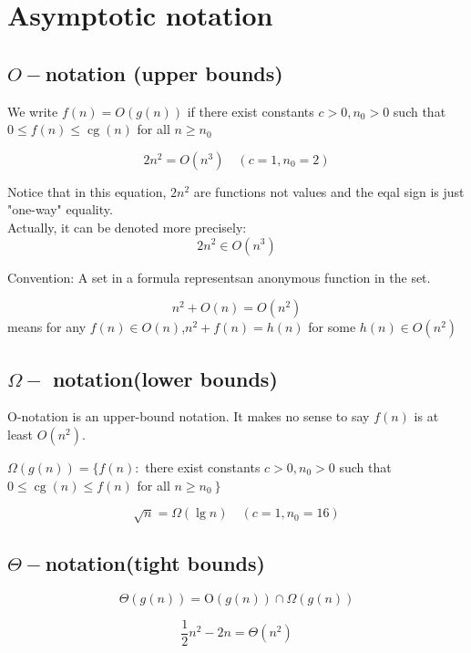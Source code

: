 \documentclass[11pt]{elegantbook}
\begin{document}
\section{Asymptotic notation}
\subsection{$O-$notation (upper bounds)}
\begin{definition}
  We write $f(n)=O(g(n))$ if there exist constants $c>0, n_{0}>0$ such that $0 \leq f(n) \leq \operatorname{cg}(n)$ for all $n \geq n_{0}$
\end{definition}
\begin{example}
  $$
  2 n^{2}=O\left(n^{3}\right) \quad\left(c=1, n_{0}=2\right)
  $$
\end{example}
\begin{note}
  Notice that in this equation, $2n^2$ are functions not values and the eqal sign is just "one-way" equality.
  \\Actually, it can be denoted more precisely: 
  $$
  2 n^{2} \in O\left(n^{3}\right)
  $$
\end{note}
\begin{note}
  Convention: A set in a formula representsan anonymous function in the set.
\end{note}
\begin{example}
  $$
  n^{2}+O(n)=O\left(n^{2}\right)
  $$
  means for any $f(n) \in O(n)$,$n^2 + f(n) = h(n)$ for some $h(n) \in O(n^2)$
\end{example}
\subsection{$\Omega-$ notation(lower bounds)}
O-notation is an upper-bound notation. It makes no sense to say $f(n)$ is at least $O(n^2)$.

\begin{definition}
  $\Omega(g(n))=\{f(n):$ there exist constants $c>0, n_{0}>0$ such that $0 \leq \operatorname{cg}(n) \leq f(n)$ for all $\left.n \geq n_{0}\right\}$
\end{definition}

\begin{example}
  $$
  \sqrt{n}=\Omega(\lg n) \quad\left(c=1, n_{0}=16\right)
  $$
\end{example}
\subsection{$\Theta-$notation(tight bounds)}
\begin{definition}
  $$
\Theta(g(n))=\mathrm{O}(g(n)) \cap \Omega(g(n))
$$
\end{definition}
\begin{example}
  $$
  \frac{1}{2} n^{2}-2 n=\Theta\left(n^{2}\right)
  $$
\end{example}
\end{document}
